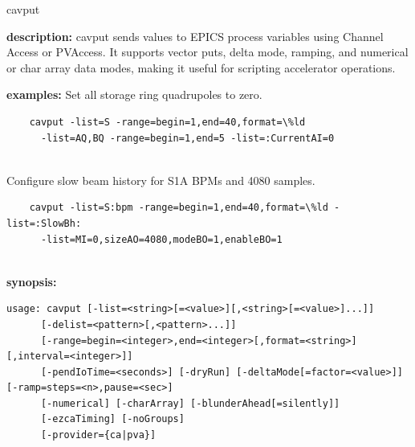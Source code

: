 \begin{sddsprog}{cavput}
\item \textbf{description:}
    cavput sends values to EPICS process variables using Channel Access or PVAccess. It supports vector puts, delta mode, ramping, and numerical or char array data modes, making it useful for scripting accelerator operations.
\item \textbf{examples:}
    Set all storage ring quadrupoles to zero.
    \begin{verbatim}
    cavput -list=S -range=begin=1,end=40,format=\%ld
      -list=AQ,BQ -range=begin=1,end=5 -list=:CurrentAI=0
    
\end{verbatim}
    Configure slow beam history for S1A BPMs and 4080 samples.
    \begin{verbatim}
    cavput -list=S:bpm -range=begin=1,end=40,format=\%ld -list=:SlowBh:
      -list=MI=0,sizeAO=4080,modeBO=1,enableBO=1
    
\end{verbatim}
\item \textbf{synopsis:}
    \begin{verbatim}
usage: cavput [-list=<string>[=<value>][,<string>[=<value>]...]]
      [-delist=<pattern>[,<pattern>...]]
      [-range=begin=<integer>,end=<integer>[,format=<string>][,interval=<integer>]]
      [-pendIoTime=<seconds>] [-dryRun] [-deltaMode[=factor=<value>]] [-ramp=steps=<n>,pause=<sec>]
      [-numerical] [-charArray] [-blunderAhead[=silently]]
      [-ezcaTiming] [-noGroups]
      [-provider={ca|pva}]
    

\end{verbatim}
\end{sddsprog}
